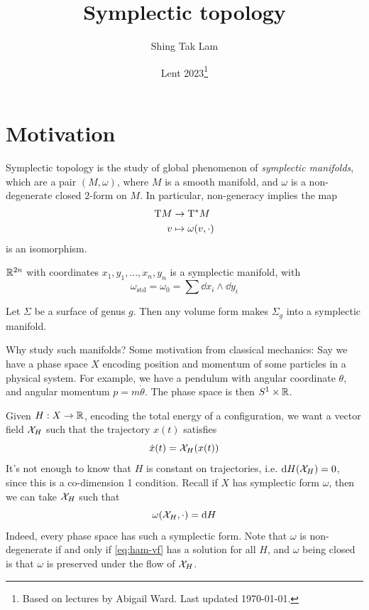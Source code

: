 \documentclass{article}
\title{Symplectic topology}
\author{Shing Tak Lam}
\date{Lent 2023\footnote{Based on lectures by Abigail Ward. Last updated \today.}}
\begin{document}
\maketitle

\tableofcontents

\lec

\section{Motivation}

Symplectic topology is the study of global phenomenon of \emph{symplectic manifolds}, which are a pair \((M, \omega)\), where \(M\) is a smooth manifold, and \(\omega\) is a non-degenerate closed \(2\)-form on \(M\). In particular, non-generacy implies the map
\begin{align*}
    \mathrm{T} M &\to \mathrm{T}^* M \\
    v &\mapsto \omega(v, \cdot)
\end{align*}
is an isomorphism.

\begin{example}
    \(\mathbb{R}^{2n}\) with coordinates \(x_1, y_1, \dots, x_n, y_n\) is a symplectic manifold, with
    \[\omega_{\text{std}} = \omega_0 = \sum \dd x_i \wedge \dd y_i\]
\end{example}

\begin{example}
    Let \(\Sigma\) be a surface of genus \(g\). Then any volume form makes \(\Sigma_g\) into a symplectic manifold.
\end{example}

Why study such manifolds? Some motivation from classical mechanics: Say we have a phase space \(X\) encoding position and momentum of some particles in a physical system. For example, we have a pendulum with angular coordinate \(\theta\), and angular momentum \(p = m\dot\theta\). The phase space is then \(S^1 \times \mathbb{R}\).

Given \(H : X \to \mathbb{R}\), encoding the total energy of a configuration, we want a vector field \(\mathcal{X}_H\) such that the trajectory \(x(t)\) satisfies
\[\dot x(t) = \mathcal{X}_H(x(t))\]
It's not enough to know that \(H\) is constant on trajectories, i.e. \(\dd H(\mathcal{X}_H) = 0\), since this is a co-dimension 1 condition. Recall if \(X\) has symplectic form \(\omega\), then we can take \(\mathcal{X}_H\) such that
\begin{equation}
    \label{eq:ham-vf}
    \omega(\mathcal{X}_H, \cdot) = \dd H
\end{equation}
Indeed, every phase space has such a symplectic form. Note that \(\omega\) is non-degenerate if and only if \cref{eq:ham-vf} has a solution for all \(H\), and \(\omega\) being closed is that \(\omega\) is preserved under the flow of \(\mathcal{X}_H\).
\end{document}
